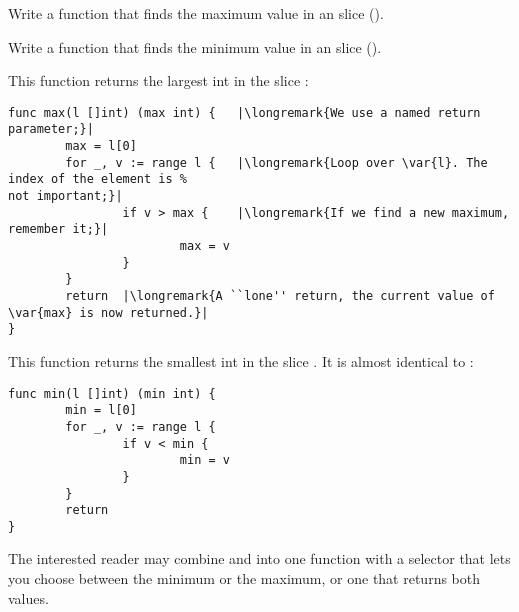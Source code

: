 \begin{Exercise}[title={Minimum and maximum},difficulty=0]
\label{ex:minmax}
\Question\label{ex:minmax q1} Write a function that finds the
maximum value in an  slice ().

\Question\label{ex:minmax q2} Write a function that finds the
minimum value in an  slice ().

\end{Exercise}

\begin{Answer}
\Question This function returns the largest int in the slice :
\begin{lstlisting}
func max(l []int) (max int) {   |\longremark{We use a named return parameter;}|
        max = l[0]      
        for _, v := range l {   |\longremark{Loop over \var{l}. The index of the element is %
not important;}|
                if v > max {    |\longremark{If we find a new maximum, remember it;}|
                        max = v 
                }   
        }   
        return  |\longremark{A ``lone'' return, the current value of \var{max} is now returned.}|
}
\end{lstlisting}
\showremarks

\Question This function returns the smallest int in the slice . It is almost identical to :
\begin{lstlisting}
func min(l []int) (min int) {
        min = l[0]
        for _, v := range l { 
                if v < min {
                        min = v 
                }   
        }   
        return
}
\end{lstlisting}
The interested reader may combine  and  into one function with a selector
that lets you choose between the minimum or the maximum, or one that returns both values.
\end{Answer}
